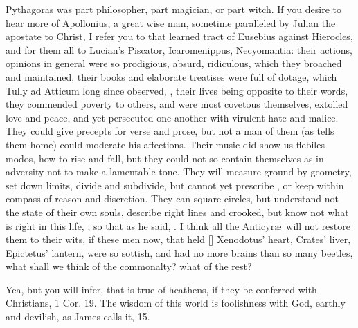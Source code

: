 {Pythagoras was part philosopher, part magician, or part witch. If you
desire to hear more of Apollonius, a great wise man, sometime
paralleled by Julian the apostate to Christ, I refer you to that
learned tract of Eusebius against Hierocles, and for them all to
Lucian's Piscator, Icaromenippus, Necyomantia: their actions, opinions
in general were so prodigious, absurd, ridiculous, which they broached
and maintained, their books and elaborate treatises were full of
dotage, which Tully ad Atticum long since observed, , their lives being opposite to their words,
they commended poverty to others, and were most covetous themselves,
extolled love and peace, and yet persecuted one another with virulent
hate and malice. They could give precepts for verse and prose, but not
a man of them (as \Seneca tells them home) could moderate his
affections. Their music did show us flebiles modos, \etc how to rise and
fall, but they could not so contain themselves as in adversity not to
make a lamentable tone. They will measure ground by geometry, set down
limits, divide and subdivide, but cannot yet prescribe , or keep within compass of reason and discretion. They can square
circles, but understand not the state of their own souls, describe
right lines and crooked, \etc but know not what is right in this life,
; so that as he said, . I think all the Anticyr\ae{}\ will
not restore them to their wits, if these men now, that held [\baselineskip]
Xenodotus' heart, Crates' liver, Epictetus' lantern, were so sottish,
and had no more brains than so many beetles, what shall we think of the
commonalty? what of the rest?

Yea, but you will infer, that is true of heathens, if they be conferred
with Christians, 1 Cor.  19. The wisdom of this world is
foolishness with God, earthly and devilish, as James calls it,  15.

}
